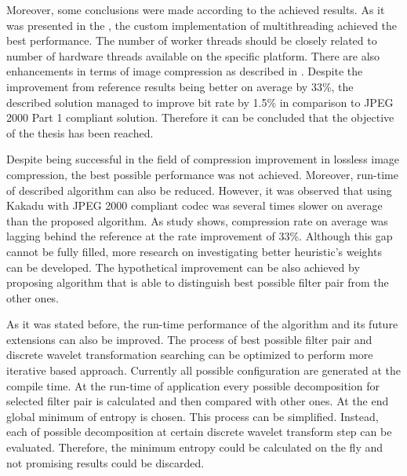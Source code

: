 Moreover, some conclusions were made according to the achieved results. As it was presented
in the , the custom implementation of multithreading achieved
the best performance. The number of worker threads should be closely related to number of
hardware threads available on the specific platform. There are also enhancements in terms of
image compression as described in . Despite the improvement from
reference results being better on average by 33\%, the described solution managed to improve bit
rate by 1.5\% in comparison to JPEG 2000 Part 1 compliant solution. Therefore it can be concluded
that the objective of the thesis has been reached.

Despite being successful in the field of compression improvement in lossless image compression, the best
possible performance was not achieved. Moreover, run-time of described algorithm can also be reduced.
However, it was observed that using Kakadu with JPEG 2000 compliant codec
was several times slower on average than the proposed algorithm.
As study shows, compression rate on average was lagging behind the reference at the rate improvement of 33\%. Although
this gap cannot be fully filled, more research on investigating better heuristic’s weights can be developed.
The hypothetical improvement can be also achieved by proposing algorithm that is able to distinguish best
possible filter pair from the other ones.

As it was stated before, the run-time performance of the algorithm and its future extensions can also be improved.
The process of best possible filter pair and discrete wavelet transformation searching can be optimized to perform
more iterative based approach. Currently all possible configuration are generated at the compile time. At the
run-time of application every possible decomposition for selected filter pair is calculated and then compared
with other ones. At the end global minimum of entropy is chosen. This process can be simplified. Instead, each of
possible decomposition at certain discrete wavelet transform step can be evaluated. Therefore, the minimum entropy
could be calculated on the fly and not promising results could be discarded.

